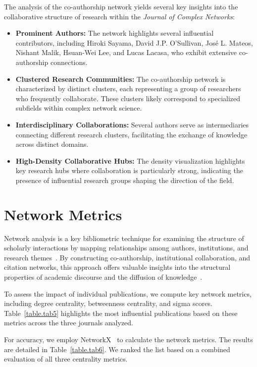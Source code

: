\documentclass[twocolumn]{article}
\begin{document}
		The analysis of the co-authorship network yields several key insights into the collaborative structure of research within the \textit{Journal of Complex Networks}:
		
		\begin{itemize}
			\item \textbf{Prominent Authors:} The network highlights several influential contributors, including Hiroki Sayama, David J.P. O’Sullivan, José L. Mateos, Nishant Malik, Hsuan-Wei Lee, and Lucas Lacasa, who exhibit extensive co-authorship connections.
			\item \textbf{Clustered Research Communities:} The co-authorship network is characterized by distinct clusters, each representing a group of researchers who frequently collaborate. These clusters likely correspond to specialized subfields within complex network science.
			\item \textbf{Interdisciplinary Collaborations:} Several authors serve as intermediaries connecting different research clusters, facilitating the exchange of knowledge across distinct domains.
			\item \textbf{High-Density Collaborative Hubs:} The density visualization highlights key research hubs where collaboration is particularly strong, indicating the presence of influential research groups shaping the direction of the field.
		\end{itemize}
		
		\section{Network Metrics}
		
		Network analysis is a key bibliometric technique for examining the structure of scholarly interactions by mapping relationships among authors, institutions, and research themes~\cite{newman2001scientific, Barabasi2002, Borgatti2009}. By constructing co-authorship, institutional collaboration, and citation networks, this approach offers valuable insights into the structural properties of academic discourse and the diffusion of knowledge~\cite{Otte2002, Liu2005}.
		
		To assess the impact of individual publications, we compute key network metrics, including degree centrality, betweenness centrality, and sigma scores. Table~\ref{table.tab5} highlights the most influential publications based on these metrics across the three journals analyzed.
		
		For accuracy, we employ NetworkX~\cite{SciPyProceedings_11} to calculate the network metrics. The results are detailed in Table~\ref{table.tab6}. We ranked the list based on a combined evaluation of all three centrality metrics.
		
\end{document}
